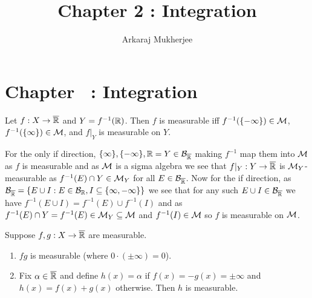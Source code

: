\documentclass[12pt,a4paper]{article}
\title{\textbf{Chapter 2 : Integration}}
\author{Arkaraj Mukherjee}
\begin{document}
\maketitle
\newpage
\tableofcontents
\newpage
\setcounter{section}{2}
\section*{Chapter \thesection\ : Integration}
\begin{problem}\label{prob:2-1}
Let $f: X \to \overline{\mathbb{R}}$ and $Y = f^{-1}(\mathbb{R})$. Then $f$ is measurable iff $f^{-1}(\{-\infty\}) \in \mathcal{M}$, $f^{-1}(\{\infty\}) \in \mathcal{M}$, and $f|_Y$ is measurable on $Y$.
\end{problem}
\begin{solution}
    For the only if direction, $\{\infty\},\{-\infty\},\mathbb{R}=Y\in\mathcal B_{\overline{\mathbb{R}}}$ making $f^{-1}$ map them into $\mathcal{M}$ as $f$ is measurable and as $\mathcal{M}$ is a sigma algebra we see that $f\vert_Y:Y\to\overline{\mathbb{R}}$ is $\mathcal{M}_Y$-measurable as $f^{-1}(E)\cap Y\in\mathcal{M}_Y$ for all $E\in\mathcal B_{\overline{\mathbb{R}}}$. 
    Now for the if direction, as $\mathcal B_{\overline{\mathbb{R}}}=\{E\cup I:E\in\mathcal B_{\mathbb{R}}, I\subseteq\{\infty,-\infty\}\}$ we see that for any such $E\cup I\in\mathcal B_{\overline{\mathbb{R}}}$ we have $f^{-1}(E\cup I)=f^{-1}(E)\cup f^{-1}(I)$ and as $f^{-1}(E)\cap Y=f^{-1}(E)\in\mathcal{M}_Y\subseteq\mathcal{M}$ and $f^{-1}(I)\in\mathcal{M}$ so $f$ is measurable on $\mathcal{M}$.
\end{solution}
\begin{problem}\label{prob:2-2}
Suppose $f, g: X \to \overline{\mathbb{R}}$ are measurable.
\begin{enumerate}[label=\alph*.]
    \item $fg$ is measurable (where $0 \cdot (\pm\infty) = 0$).
    \item Fix $\alpha \in \overline{\mathbb{R}}$ and define $h(x) = \alpha$ if $f(x) = -g(x) = \pm\infty$ and $h(x) = f(x) + g(x)$ otherwise. Then $h$ is measurable.
\end{enumerate}
\end{problem}
\end{document}

